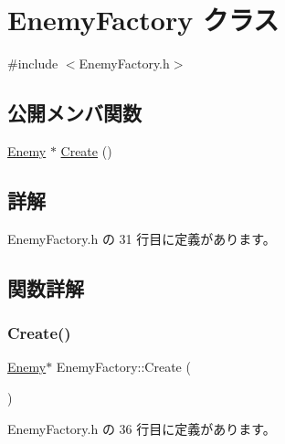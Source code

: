 \hypertarget{class_enemy_factory}{}\section{Enemy\+Factory クラス}
\label{class_enemy_factory}


{\ttfamily \#include $<$Enemy\+Factory.\+h$>$}

\subsection*{公開メンバ関数}
\begin{DoxyCompactItemize}
\item 
\mbox{\hyperlink{class_enemy}{Enemy}} $\ast$ \mbox{\hyperlink{class_enemy_factory_a74729ede6a5f0e1cbdf3215a052e314a}{Create}} ()
\end{DoxyCompactItemize}


\subsection{詳解}


 Enemy\+Factory.\+h の 31 行目に定義があります。



\subsection{関数詳解}
\mbox{\label{class_enemy_factory_a74729ede6a5f0e1cbdf3215a052e314a}} 
\subsubsection{\texorpdfstring{Create()}{Create()}}
{\footnotesize\ttfamily \mbox{\hyperlink{class_enemy}{Enemy}}$\ast$ Enemy\+Factory\+::\+Create (\begin{DoxyParamCaption}{ }\end{DoxyParamCaption})\hspace{0.3cm}{\ttfamily [inline]}}



 Enemy\+Factory.\+h の 36 行目に定義があります。

